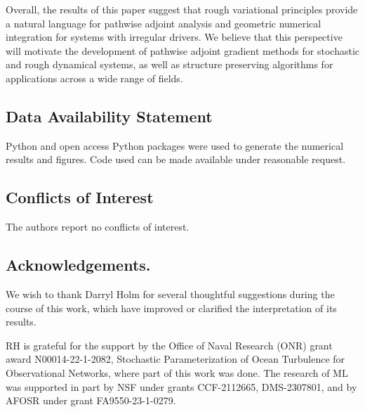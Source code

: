 \documentclass[11pt, oneside]{article}
\numberwithin{equation}{section}
\theoremstyle{definition}
\begin{document}
Overall, the results of this paper suggest that rough variational principles provide a natural language for pathwise adjoint analysis and geometric numerical integration for systems with irregular drivers. We believe that this perspective will motivate the development of pathwise adjoint gradient methods for stochastic and rough dynamical systems, as well as structure preserving algorithms for applications across a wide range of fields.


\subsection*{Data Availability Statement}
Python and open access Python packages were used to generate the numerical results and figures. Code used can be made available under reasonable request. 

\subsection*{Conflicts of Interest}
The authors report no conflicts of interest.

\subsection*{Acknowledgements.}
We wish to thank Darryl Holm for several thoughtful suggestions during the course of this work, which have improved or clarified the interpretation of its results.

RH is grateful for the support by the Office of Naval Research (ONR) grant award N00014-22-1-2082, Stochastic Parameterization of Ocean Turbulence for Observational Networks, where part of this work was done. The research of ML was supported in part by NSF under grants CCF-2112665, DMS-2307801, and by AFOSR under grant FA9550-23-1-0279.


\appendix
\end{document}
